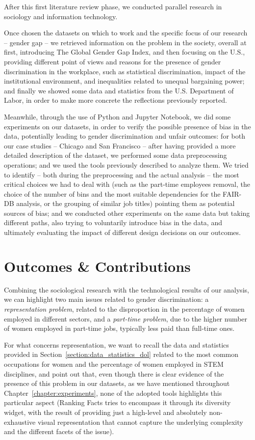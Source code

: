 After this first literature review phase, we conducted parallel research in sociology and information technology.

Once chosen the datasets on which to work and the specific focus of our research -- gender gap -- we retrieved information on the problem in the society, overall at first, introducing The Global Gender Gap Index, and then focusing on the U.S., providing different point of views and reasons for the presence of gender discrimination in the workplace, such as statistical discrimination, impact of the institutional environment, and inequalities related to unequal bargaining power; and finally we showed some data and statistics from the U.S. Department of Labor, in order to make more concrete the reflections previously reported.

Meanwhile, through the use of Python and Jupyter Notebook, we did some experiments on our datasets, in order to verify the possible presence of bias in the data, potentially leading to gender discrimination and unfair outcomes: for both our case studies -- Chicago and San Francisco -- after having provided a more detailed description of the dataset, we performed some data preprocessing operations; and we used the tools previously described to analyze them. We tried to identify -- both during the preprocessing and the actual analysis -- the most critical choices we had to deal with (such as the part-time employees removal, the choice of the number of bins and the most suitable dependencies for the FAIR-DB analysis, or the grouping of similar job titles) pointing them as potential sources of bias; and we conducted other experiments on the same data but taking different paths, also trying to voluntarily introduce bias in the data, and ultimately evaluating the impact of different design decisions on our outcomes.


\section{Outcomes \& Contributions}
Combining the sociological research with the technological results of our analysis, we can highlight two main issues related to gender discrimination: a \textit{representation problem}, related to the disproportion in the percentage of women employed in different sectors, and a \textit{part-time problem}, due to the higher number of women employed in part-time jobs, typically less paid than full-time ones.

For what concerns representation, we want to recall the data and statistics provided in Section~\ref{section:data_statistics_dol} related to the most common occupations for women and the percentage of women employed in STEM disciplines, and point out that, even though there is clear evidence of the presence of this problem in our datasets, as we have mentioned throughout Chapter~\ref{chapter:experiments}, none of the adopted tools highlights this particular aspect (Ranking Facts tries to encompass it through its diversity widget, with the result of providing just a high-level and absolutely non-exhaustive visual representation that cannot capture the underlying complexity and the different facets of the issue).

